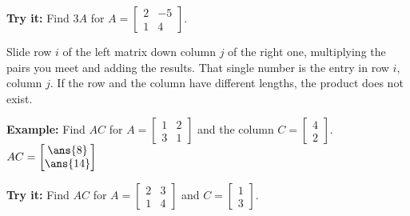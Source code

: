 \documentclass[12pt]{article}
\begin{document}
\begin{tryitbox}
\textbf{Try it:} Find $3A$ for
$A = \left[\begin{smallmatrix} 2 & -5 \\ 1 & 4 \end{smallmatrix}\right]$.\\[2pt]
\end{tryitbox}


\begin{formulabox}
Slide row $i$ of the left matrix down column $j$ of the right one, multiplying
the pairs you meet and adding the results. That single number is the entry in
row $i$, column $j$. If the row and the column have different lengths, the
product does not exist.
\end{formulabox}

\begin{examplebox}
\textbf{Example:} Find $AC$ for
$A = \left[\begin{smallmatrix} 1 & 2 \\ 3 & 1 \end{smallmatrix}\right]$ and the
column $C = \left[\begin{smallmatrix} 4 \\ 2 \end{smallmatrix}\right]$.
$AC = \begin{bmatrix} \ans{8} \\ \ans{14} \end{bmatrix}$
\end{examplebox}

\begin{tryitbox}
\textbf{Try it:} Find $AC$ for
$A = \left[\begin{smallmatrix} 2 & 3 \\ 1 & 4 \end{smallmatrix}\right]$ and
$C = \left[\begin{smallmatrix} 1 \\ 3 \end{smallmatrix}\right]$.\\[2pt]
\end{tryitbox}
\end{document}
